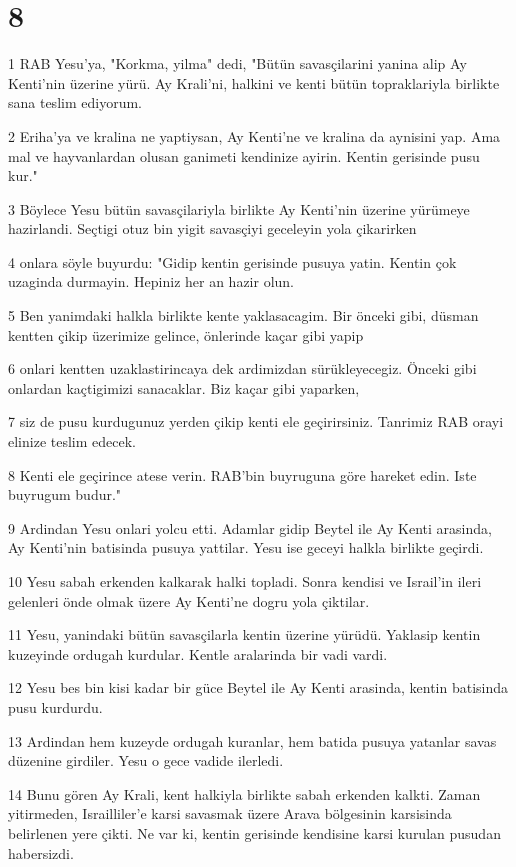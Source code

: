 \chapter{8}

\par 1 RAB Yesu'ya, "Korkma, yilma" dedi, "Bütün savasçilarini yanina alip Ay Kenti'nin üzerine yürü. Ay Krali'ni, halkini ve kenti bütün topraklariyla birlikte sana teslim ediyorum.
\par 2 Eriha'ya ve kralina ne yaptiysan, Ay Kenti'ne ve kralina da aynisini yap. Ama mal ve hayvanlardan olusan ganimeti kendinize ayirin. Kentin gerisinde pusu kur."
\par 3 Böylece Yesu bütün savasçilariyla birlikte Ay Kenti'nin üzerine yürümeye hazirlandi. Seçtigi otuz bin yigit savasçiyi geceleyin yola çikarirken
\par 4 onlara söyle buyurdu: "Gidip kentin gerisinde pusuya yatin. Kentin çok uzaginda durmayin. Hepiniz her an hazir olun.
\par 5 Ben yanimdaki halkla birlikte kente yaklasacagim. Bir önceki gibi, düsman kentten çikip üzerimize gelince, önlerinde kaçar gibi yapip
\par 6 onlari kentten uzaklastirincaya dek ardimizdan sürükleyecegiz. Önceki gibi onlardan kaçtigimizi sanacaklar. Biz kaçar gibi yaparken,
\par 7 siz de pusu kurdugunuz yerden çikip kenti ele geçirirsiniz. Tanrimiz RAB orayi elinize teslim edecek.
\par 8 Kenti ele geçirince atese verin. RAB'bin buyruguna göre hareket edin. Iste buyrugum budur."
\par 9 Ardindan Yesu onlari yolcu etti. Adamlar gidip Beytel ile Ay Kenti arasinda, Ay Kenti'nin batisinda pusuya yattilar. Yesu ise geceyi halkla birlikte geçirdi.
\par 10 Yesu sabah erkenden kalkarak halki topladi. Sonra kendisi ve Israil'in ileri gelenleri önde olmak üzere Ay Kenti'ne dogru yola çiktilar.
\par 11 Yesu, yanindaki bütün savasçilarla kentin üzerine yürüdü. Yaklasip kentin kuzeyinde ordugah kurdular. Kentle aralarinda bir vadi vardi.
\par 12 Yesu bes bin kisi kadar bir güce Beytel ile Ay Kenti arasinda, kentin batisinda pusu kurdurdu.
\par 13 Ardindan hem kuzeyde ordugah kuranlar, hem batida pusuya yatanlar savas düzenine girdiler. Yesu o gece vadide ilerledi.
\par 14 Bunu gören Ay Krali, kent halkiyla birlikte sabah erkenden kalkti. Zaman yitirmeden, Israilliler'e karsi savasmak üzere Arava bölgesinin karsisinda belirlenen yere çikti. Ne var ki, kentin gerisinde kendisine karsi kurulan pusudan habersizdi.
